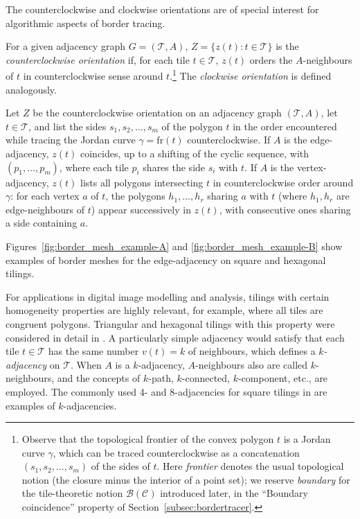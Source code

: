 The counterclockwise and clockwise orientations are of special interest for algorithmic aspects of border tracing.

\begin{definition}\label{def:cc-orientation}
    For a given adjacency graph $G=(\mathcal{T},A)$, $Z=\{z(t):t\in\mathcal{T}\}$ is the \emph{counterclockwise orientation} if, for each tile $t\in\mathcal{T}$, $z(t)$ orders the $A$-neighbours of $t$ in counterclockwise sense around $t$.\footnote{Observe that the topological frontier of the convex polygon $t$ is a Jordan curve $\gamma$, which can be traced counterclockwise as a concatenation $(s_1, s_2, \dots , s_m)$ of the sides of $t$. Here \emph{frontier} denotes the usual topological notion (the closure minus the interior of a point set); we reserve \emph{boundary} for the tile-theoretic notion $\mathcal{B}(\mathcal{C})$ introduced later, in the ``Boundary coincidence'' property of Section~\ref{subsec:bordertracer}.}
    The \emph{clockwise orientation} is defined analogously.
\end{definition}

\begin{remark}
    Let $Z$ be the counterclockwise orientation on an adjacency graph $(\mathcal{T},A)$, let $t\in\mathcal{T}$, and list the sides $s_1,s_2,\dots,s_m$ of the polygon $t$ in the order encountered while tracing the Jordan curve $\gamma=\mathrm{fr}(t)$ counterclockwise.
    If $A$ is the edge-adjacency, $z(t)$ coincides, up to a shifting of the cyclic sequence, with $(p_1,\dots,p_m)$, where each tile $p_i$ shares the side $s_i$ with $t$.
    If $A$ is the vertex-adjacency, $z(t)$ lists all polygons intersecting $t$ in counterclockwise order around $\gamma$: for each vertex $a$ of $t$, the polygons $h_1,\dots,h_r$ sharing $a$ with $t$ (where $h_1,h_r$ are edge-neighbours of $t$) appear successively in $z(t)$, with consecutive ones sharing a side containing $a$.
\end{remark}

Figures~\ref{fig:border_mesh_example-A} and \ref{fig:border_mesh_example-B} show examples of border meshes for the edge-adjacency on square and hexagonal tilings.

For applications in digital image modelling and analysis, tilings with certain homogeneity properties are highly relevant, for example, where all tiles are congruent polygons.
Triangular and hexagonal tilings with this property were considered in detail in \cite{WiederholdMatosWiederhold2026}.
A particularly simple adjacency would satisfy that each tile $t\in \mathcal{T}$ has the same number $v(t)=k$ of neighbours, which defines a \emph{$k$-adjacency} on $\mathcal{T}$.
When $A$ is a $k$-adjacency, $A$-neighbours also are called $k$-neighbours, and the concepts of $k$-path, $k$-connected, $k$-component, etc., are employed.
The commonly used 4- and 8-adjacencies for square tilings in \cite{gonzalez2018,klette2004} are examples of $k$-adjacencies.

